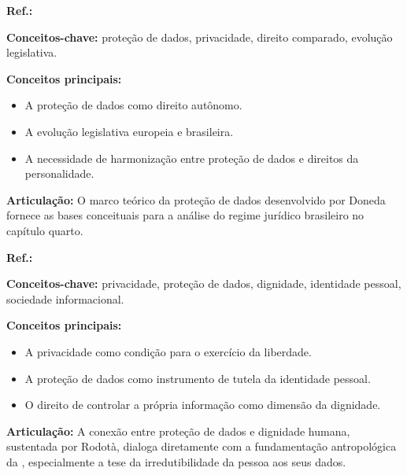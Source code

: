 \begin{fichamento}
    \textbf{Ref.:} \cite{Doneda2006PDD}
    
    \textbf{Conceitos-chave:} proteção de dados, privacidade, direito comparado, evolução legislativa.
    
    \textbf{Conceitos principais:}
    \begin{itemize}
        \item A proteção de dados como direito autônomo.
        \item A evolução legislativa europeia e brasileira.
        \item A necessidade de harmonização entre proteção de dados e direitos da personalidade.
    \end{itemize}
    
    \textbf{Articulação:} O marco teórico da proteção de dados desenvolvido por Doneda fornece as bases conceituais para a análise do regime jurídico brasileiro no capítulo quarto.
\end{fichamento}

\begin{fichamento}
    \textbf{Ref.:} \cite{Rodota2008PDA}
    
    \textbf{Conceitos-chave:} privacidade, proteção de dados, dignidade, identidade pessoal, sociedade informacional.
    
    \textbf{Conceitos principais:}
    \begin{itemize}
        \item A privacidade como condição para o exercício da liberdade.
        \item A proteção de dados como instrumento de tutela da identidade pessoal.
        \item O direito de controlar a própria informação como dimensão da dignidade.
    \end{itemize}
    
    \textbf{Articulação:} A conexão entre proteção de dados e dignidade humana, sustentada por Rodotà, dialoga diretamente com a fundamentação antropológica da \MH{}, especialmente a tese da irredutibilidade da pessoa aos seus dados.
\end{fichamento}

